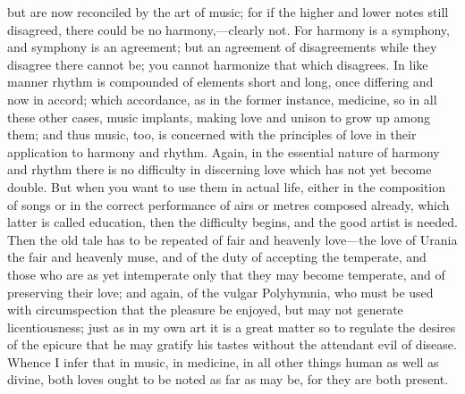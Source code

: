 \documentclass[11pt,letter]{article}
\begin{document}
but are now reconciled by the art of music; for if the higher and lower notes still disagreed, there could be no harmony,—clearly not. For harmony is a symphony, and symphony is an agreement; but an agreement of disagreements while they disagree there cannot be; you cannot harmonize that which disagrees. In like manner rhythm is compounded of elements short and long, once differing and now in accord; which accordance, as in the former instance, medicine, so in all these other cases, music implants, making love and unison to grow up among them; and thus music, too, is concerned with the principles of love in their application to harmony and rhythm. Again, in the essential nature of harmony and rhythm there is no difficulty in discerning love which has not yet become double. But when you want to use them in actual life, either in the composition of songs or in the correct performance of airs or metres composed already, which latter is called education, then the difficulty begins, and the good artist is needed. Then the old tale has to be repeated of fair and heavenly love—the love of Urania the fair and heavenly muse, and of the duty of accepting the temperate, and those who are as yet intemperate only that they may become temperate, and of preserving their love; and again, of the vulgar Polyhymnia, who must be used with circumspection that the pleasure be enjoyed, but may not generate licentiousness; just as in my own art it is a great matter so to regulate the desires of the epicure that he may gratify his tastes without the attendant evil of disease. Whence I infer that in music, in medicine, in all other things human as well as divine, both loves ought to be noted as far as may be, for they are both present.
\end{document}
